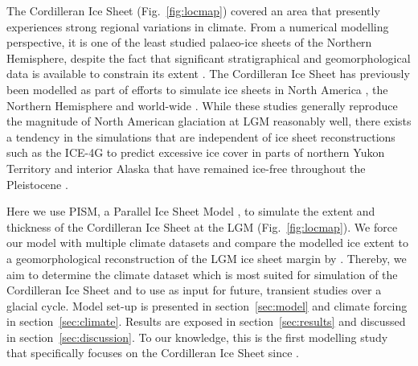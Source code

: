 The Cordilleran Ice Sheet (Fig.~\ref{fig:locmap}) covered an area that presently experiences strong regional variations in climate. From a numerical modelling perspective, it is one of the least studied palaeo-ice sheets of the Northern Hemisphere, despite the fact that significant stratigraphical and geomorphological data is available to constrain its extent \citep{jackson-clague-1991,dukrodkin-1999,kaufman-manley-2004,kleman-etal-2010,margold-etal-2011}. The Cordilleran Ice Sheet has previously been modelled as part of efforts to simulate ice sheets in North America \citep{marshall-clarke-1999,calov-etal-2002,tarasov-peltier-1997,tarasov-peltier-2004,gregoire-etal-2012}, the Northern Hemisphere \citep{huybrechts-tsiobbel-1996,greve-etal-1999,charbit-etal-2002,charbit-etal-2007,charbit-etal-2013,johnson-fastook-2002,rodgers-etal-2004,bintanja-etal-2005,zweck-huybrechts-2005,abeouchi-etal-2007} and world-wide \citep{yoshimori-etal-2001}. While these studies generally reproduce the magnitude of North American glaciation at LGM reasonably well, there exists a tendency in the simulations that are independent of ice sheet reconstructions such as the ICE-4G to predict excessive ice cover in parts of northern Yukon Territory and interior Alaska that have remained ice-free throughout the Pleistocene \citep{dukrodkin-1999,kaufman-manley-2004}.

Here we use PISM, a Parallel Ice Sheet Model \citep{web:pism}, to simulate the extent and thickness of the Cordilleran Ice Sheet at the LGM (Fig.~\ref{fig:locmap}). We force our model with multiple climate datasets and compare the modelled ice extent to a geomorphological reconstruction of the LGM ice sheet margin by \citet{dyke-2004}. Thereby, we aim to determine the climate dataset which is most suited for simulation of the Cordilleran Ice Sheet and to use as input for future, transient studies over a glacial cycle. Model set-up is presented in section~\ref{sec:model} and climate forcing in section~\ref{sec:climate}. Results are exposed in section~\ref{sec:results} and discussed in section~\ref{sec:discussion}. To our knowledge, this is the first modelling study that specifically focuses on the Cordilleran Ice Sheet since \citet{robert-1991}.
